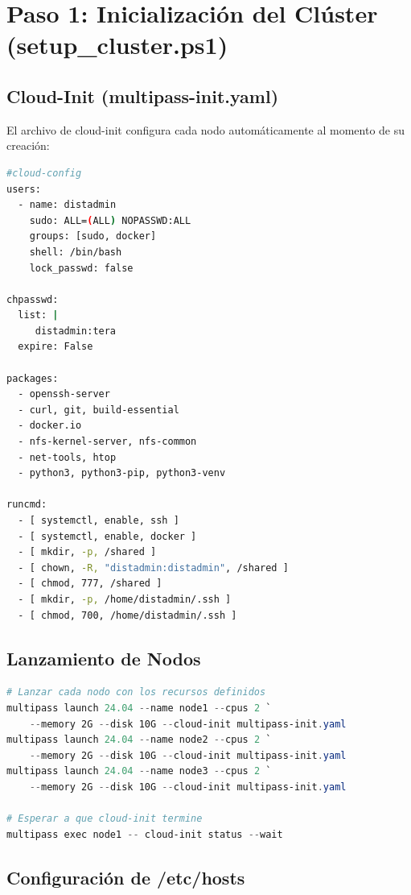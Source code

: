 \documentclass[12pt,a4paper]{article}
\begin{document}
\section{Paso 1: Inicialización del Clúster (setup\_cluster.ps1)}

\subsection{Cloud-Init (multipass-init.yaml)}

El archivo de cloud-init configura cada nodo automáticamente al momento de su creación:

\begin{lstlisting}[language=bash, title=multipass-init.yaml]
#cloud-config
users:
  - name: distadmin
    sudo: ALL=(ALL) NOPASSWD:ALL
    groups: [sudo, docker]
    shell: /bin/bash
    lock_passwd: false

chpasswd:
  list: |
     distadmin:tera
  expire: False

packages:
  - openssh-server
  - curl, git, build-essential
  - docker.io
  - nfs-kernel-server, nfs-common
  - net-tools, htop
  - python3, python3-pip, python3-venv

runcmd:
  - [ systemctl, enable, ssh ]
  - [ systemctl, enable, docker ]
  - [ mkdir, -p, /shared ]
  - [ chown, -R, "distadmin:distadmin", /shared ]
  - [ chmod, 777, /shared ]
  - [ mkdir, -p, /home/distadmin/.ssh ]
  - [ chmod, 700, /home/distadmin/.ssh ]
\end{lstlisting}

\subsection{Lanzamiento de Nodos}

\begin{lstlisting}[language=powershell, title=Comando de lanzamiento]
# Lanzar cada nodo con los recursos definidos
multipass launch 24.04 --name node1 --cpus 2 `
    --memory 2G --disk 10G --cloud-init multipass-init.yaml
multipass launch 24.04 --name node2 --cpus 2 `
    --memory 2G --disk 10G --cloud-init multipass-init.yaml
multipass launch 24.04 --name node3 --cpus 2 `
    --memory 2G --disk 10G --cloud-init multipass-init.yaml

# Esperar a que cloud-init termine
multipass exec node1 -- cloud-init status --wait
\end{lstlisting}

\subsection{Configuración de /etc/hosts}
\end{document}
